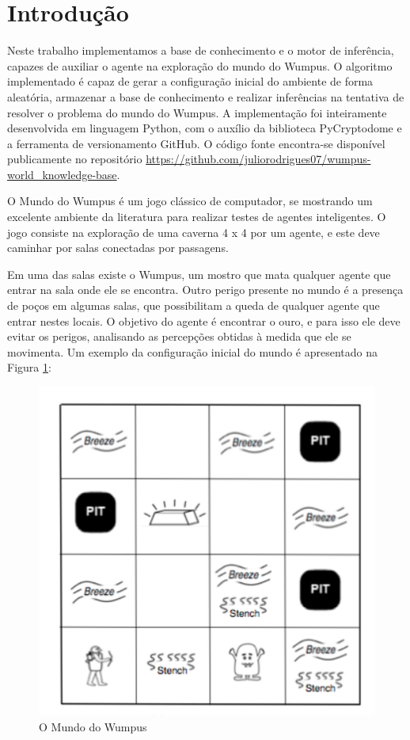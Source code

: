 \documentclass[a4paper, 12pt]{article}
\begin{document}
\tableofcontents
\newpage
\section{Introdução}

Neste trabalho implementamos a base de conhecimento e o motor de inferência, capazes de auxiliar o agente na exploração do mundo do Wumpus. O algoritmo implementado é capaz de gerar a configuração inicial do ambiente de forma aleatória, armazenar a base de conhecimento e realizar inferências na tentativa de resolver o problema do mundo do Wumpus. A implementação foi inteiramente desenvolvida em linguagem Python, com o auxílio da biblioteca PyCryptodome e a ferramenta de versionamento GitHub. O código fonte encontra-se disponível publicamente no repositório \url{https://github.com/juliorodrigues07/wumpus-world_knowledge-base}.

O Mundo do Wumpus é um jogo clássico de computador, se mostrando um excelente ambiente da literatura para realizar testes de agentes inteligentes. O jogo consiste na exploração de uma caverna 4 x 4 por um agente, e este deve caminhar por salas conectadas por passagens.

Em uma das salas existe o Wumpus, um mostro que mata qualquer agente que entrar na sala onde ele se encontra. Outro perigo presente no mundo é a presença de poços em algumas salas, que possibilitam a queda de qualquer agente que entrar nestes locais. O objetivo do agente é encontrar o ouro, e para isso ele deve evitar os perigos, analisando as percepções obtidas à medida que ele se movimenta. Um exemplo da configuração inicial do mundo é apresentado na Figura \ref{fig:Figure1}:

\begin{figure}[H]
    \centering
    \includegraphics[scale=0.93]{wumpus}
    \caption{O Mundo do Wumpus}
    \label{fig:Figure1}
\end{figure}
\end{document}
